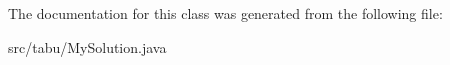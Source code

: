 The documentation for this class was generated from the following file\+:\begin{DoxyCompactItemize}
\item 
src/tabu/My\+Solution.\+java\end{DoxyCompactItemize}
